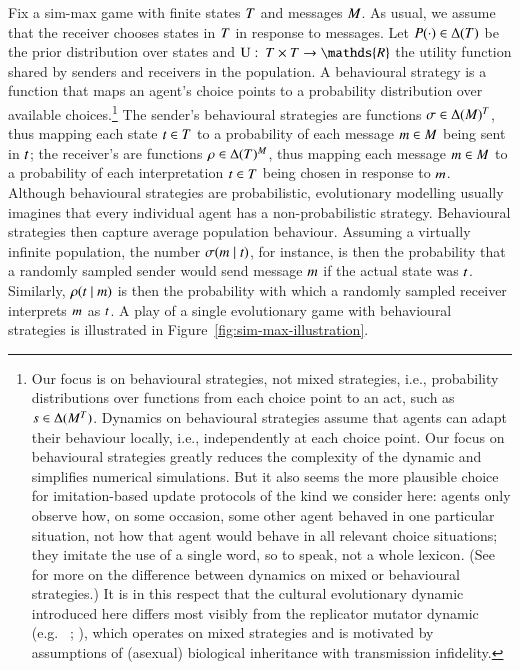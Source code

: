 \documentclass[11pt,english]{article}
\renewcommand{\Pr}{\ensuremath{P}}
\numberwithin{equation}{section}
\newcommand{\citealtbjps}[1]{\citeauthor{#1} \citeyear{#1}}
\begin{document}
Fix a sim-max game with finite states $T$ and messages $M$. As usual, we assume
that the receiver chooses states in $T$ in response to messages. Let
$\Pr(\cdot) \in \Delta(\States)$ be the prior distribution over states and
$\Util \mycolon \States \times \States \rightarrow \mathds{R}$ the utility function shared by
senders and receivers in the population. A behavioural strategy is a function that maps
an agent's choice points to a probability distribution over available
choices.\footnote{\label{fn:mixedStrats}Our focus is on behavioural strategies, not mixed
    strategies, i.e., probability distributions over functions from each choice point to an
  act, such as $s \in \Delta(M^{T})$.  Dynamics on behavioural strategies assume
  that agents can adapt their behaviour locally, i.e., independently at each choice point. Our
  focus on behavioural strategies greatly reduces the complexity of the dynamic and simplifies
  numerical simulations. But it also seems the more plausible choice for imitation-based update
  protocols of the kind we consider here: agents only observe how, on some occasion, some other
  agent behaved in one particular situation, not how that agent would behave in
  all relevant choice situations; they imitate the use of a single word, so to speak,
  not a whole lexicon. (See \citealtbjps{Cressman2003:Evolutionary-Dy} for more on the difference
  between dynamics on mixed or behavioural strategies.) It is in this respect that the cultural
  evolutionary dynamic introduced here differs most visibly from the replicator mutator dynamic
  (e.g.~\citealtbjps{NowakPlotkin2000:The-Evolution-o}; \citealtbjps{NowakKomarova2001:Evolution-of-Un}), which
  operates on mixed strategies and is motivated by assumptions of (asexual) biological
  inheritance with transmission infidelity.} The sender's behavioural strategies are
functions $\sigma \in \Delta(M)^T$, thus mapping each state $t \in T$
to a probability of each message $m \in M$ being sent in $t$; the receiver's
are functions $\rho \in \Delta(T)^M$, thus mapping each message
$m \in M$ to a probability of each interpretation $t \in T$ being chosen
in response to $m$. Although behavioural strategies are probabilistic, evolutionary
modelling usually imagines that every individual agent has a non-probabilistic
strategy. Behavioural strategies then capture average population behaviour. Assuming a virtually
infinite population, the number $\sigma(m \mid t)$, for instance, is then the
probability that a randomly sampled sender would send message $m$ if the actual state was
$t$. Similarly, $\rho(t \mid m)$ is then the probability with which a
randomly sampled receiver interprets $m$ as $t$. A play of a single evolutionary game
with behavioural strategies is illustrated in Figure~\ref{fig:sim-max-illustration}.
\end{document}
